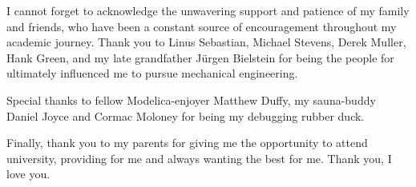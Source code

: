 I cannot forget to acknowledge the unwavering support and patience of my family and friends, who have been a constant source of encouragement throughout my academic journey. Thank you to Linus Sebastian, Michael Stevens, Derek Muller, Hank Green, and my late grandfather J\"urgen Bielstein for being the people for ultimately influenced me to pursue mechanical engineering. 


Special thanks to fellow Modelica-enjoyer Matthew Duffy, my sauna-buddy Daniel Joyce and Cormac Moloney for being my debugging rubber duck. 

Finally, thank you to my parents for giving me the opportunity to attend university, providing for me and always wanting the best for me. Thank you, I love you.








\endgroup
